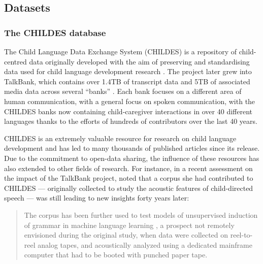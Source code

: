 
\subsection{Datasets}

\subsubsection{The CHILDES database}


The Child Language Data Exchange System (CHILDES) is a repository of child-centred data originally developed with the aim of preserving and standardising data used for child language development research \citep{macwhinney1985child}. The project later grew into TalkBank, which contains over 1.4TB of transcript data and 5TB of associated media data across several ``banks'' \citep{macwhinney_understanding_2019}. Each bank focuses on a different area of human communication, with a general focus on spoken communication, with the CHILDES banks now containing child-caregiver interactions in over 40 different languages thanks to the efforts of hundreds of contributors over the last 40 years. 

CHILDES is an extremely valuable resource for research on child language development and has led to many thousands of published articles since its release. Due to the commitment to open-data sharing, the influence of these resources has also extended to other fields of research. For instance, in a recent assessment on the impact of the TalkBank project, \citet{bernstein_ratner_augmenting_2024} noted that a corpus she had contributed to CHILDES --- originally collected to study the acoustic features of child-directed speech \citep{Ratner_1984} --- was still leading to new insights forty years later:
\begin{quote}
The corpus has been further used to test models of unsupervised induction of grammar in machine language learning \citep{glushchenko_programmatic_2019}, a prospect not remotely envisioned during the original study, when data were collected on reel-to-reel analog tapes, and acoustically analyzed using a dedicated mainframe computer that had to be booted with punched paper tape.
\end{quote}

